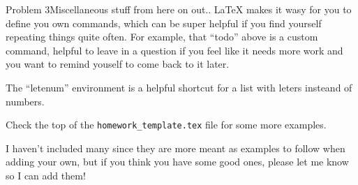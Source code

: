 \documentclass[11pt]{article}
\begin{document}
\begin{question}{Problem 3}{Miscellaneous stuff from here on out..}
  \LaTeX \; makes it wasy for you to define you own commands, which can be super
  helpful if you find yourself repeating things quite often. For example, that
  ``todo'' above is a custom command, helpful to leave in a question if you feel
  like it needs more work and you want to remind youself to come back to it
  later.
  \begin{letenum}
    \item The ``letenum'' environment is a helpful shortcut for a list with
      leters insteand of numbers.
    \item Check the top of the \texttt{homework\_template.tex} file for some
      more examples.
     \item I haven't included many since they are more meant as examples to follow when
       adding your own, but if you think you have some good ones, please let me
       know so I can add them!
  \end{letenum}
\end{question}

\pagebreak
\end{document}
